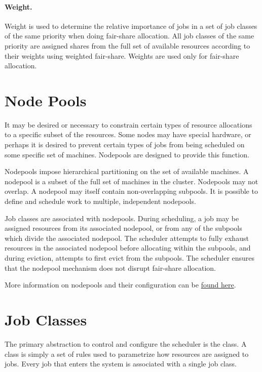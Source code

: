     \paragraph{Weight.} Weight is used to determine the relative importance of jobs in a set of job classes of 
    the same priority when doing fair-share allocation. All job classes of the same priority are assigned 
    shares from the full set of available resources according to their weights using weighted fair-share. 
    Weights are used only for fair-share allocation. 
    
    \section{Node Pools}
    It may be desired or necessary to constrain certain types of resource allocations to a specific
    subset of the resources. Some nodes may have special hardware, or perhaps it is desired to
    prevent certain types of jobs from being scheduled on some specific set of machines. Nodepools
    are designed to provide this function.

    Nodepools impose hierarchical partitioning on the set of available machines. A nodepool is a
    subset of the full set of machines in the cluster. Nodepools may not overlap. A nodepool may
    itself contain non-overlapping subpools.  It is possible to define and schedule work to
    multiple, independent nodepools.

    Job classes are associated with nodepools. During scheduling, a job may be assigned resources
    from its associated nodepool, or from any of the subpools which divide the associated nodepool.
    The scheduler attempts to fully exhaust resources in the associated nodepool before allocating
    within the subpools, and during eviction, attempts to first evict from the subpools. The
    scheduler ensures that the nodepool mechanism does not disrupt fair-share allocation.
    
    More information on nodepools and their configuration can be \hyperref[subsec:nodepools]{found here}.

    \section{Job Classes}
    \label{sec:rm.job-classes}
    The primary abstraction to control and configure the scheduler is the class. A class is simply a set 
    of rules used to parametrize how resources are assigned to jobs. Every job that enters the system is 
    associated with a single job class. 
    
